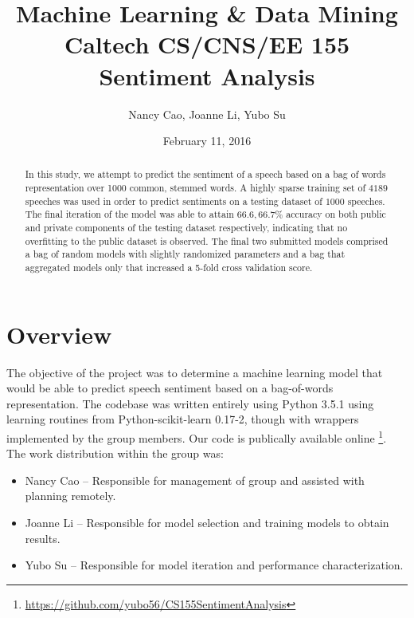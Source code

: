 \documentclass[10pt]{article}
\begin{document}
\pagestyle{fancy}
\cfoot{\thepage/\pageref{LastPage}}

\title{Machine Learning \& Data Mining\\
      Caltech CS/CNS/EE 155 \\[1pt]
      Sentiment Analysis}
\author{Nancy Cao, Joanne Li, Yubo Su}
\date{February 11, 2016}
\maketitle

\begin{abstract}
In this study, we attempt to predict the sentiment of a speech based on a bag of words representation over 1000 common, stemmed words. A highly sparse training set of $4189$ speeches was used in order to predict sentiments on a testing dataset of $1000$ speeches. The final iteration of the model was able to attain $66.6, 66.7\%$ accuracy on both public and private components of the testing dataset respectively, indicating that no overfitting to the public dataset is observed. The final two submitted models comprised a bag of random models with slightly randomized parameters and a bag that aggregated models only that increased a 5-fold cross validation score.
\end{abstract}

\section{Overview}

The objective of the project was to determine a machine learning model that would be able to predict speech sentiment based on a bag-of-words representation. The codebase was written entirely using Python 3.5.1 using learning routines from Python-scikit-learn 0.17-2, though with wrappers implemented by the group members. Our code is publically available online \footnote{\url{https://github.com/yubo56/CS155SentimentAnalysis}}. The work distribution within the group was:
\begin{itemize}
    \item Nancy Cao -- Responsible for management of group and assisted with planning remotely.
    \item Joanne Li -- Responsible for model selection and training models to obtain results.
    \item Yubo Su -- Responsible for model iteration and performance characterization.
\end{itemize}
\end{document}
